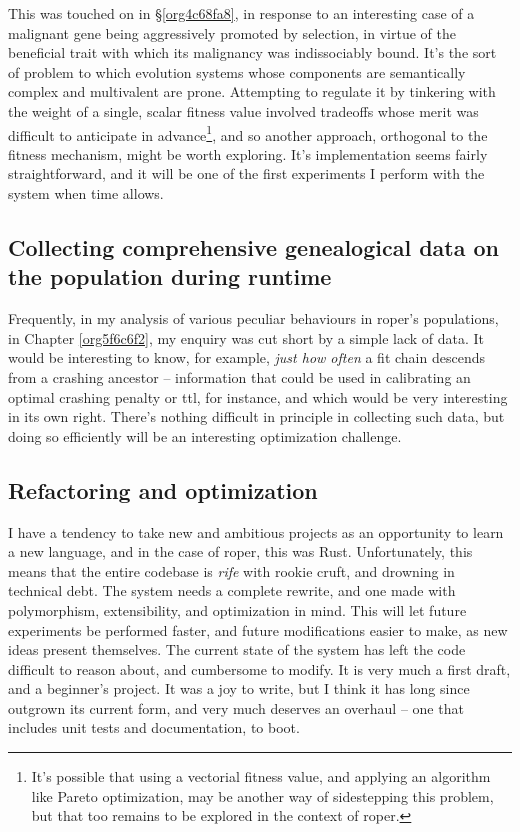 \documentclass[12pt,glossary]{dalthesis}
\begin{document}
This was touched on in \S \ref{org4c68fa8}, in response to an interesting case
of a malignant gene being aggressively promoted by selection, in virtue of the
beneficial trait with which its malignancy was indissociably bound. It's the
sort of problem to which evolution systems whose components are semantically
complex and multivalent are prone. Attempting to regulate it by tinkering with
the weight of a single, scalar fitness value involved tradeoffs whose merit was
difficult to anticipate in advance\footnote{It's possible that using a vectorial fitness value, and applying an algorithm
  like Pareto optimization, may be another way of sidestepping this problem, but
  that too remains to be explored in the context of \gls{roper}.}, and so another approach, orthogonal to the fitness mechanism, might be worth
exploring. It's implementation seems fairly straightforward, and it will be one
of the first experiments I perform with the system when time allows. 

\subsection{Collecting comprehensive genealogical data on the population during runtime}
\label{sec:org22b3f6f}

Frequently, in my analysis of various peculiar behaviours in \gls{roper}'s
populations, in Chapter \ref{org5f6c6f2}, my enquiry was cut short by a simple
lack of data. It would be interesting to know, for example, \emph{just how often} a
fit chain descends from a crashing ancestor -- information that could be used in
calibrating an optimal crashing penalty or \gls{ttl}, for instance, and which would
be very interesting in its own right. There's nothing difficult in principle in
collecting such data, but doing so efficiently will be an interesting optimization
challenge. 

\subsection{Refactoring and optimization}
\label{sec:org9085419}

I have a tendency to take new and ambitious projects as an opportunity to learn
a new language, and in the case of \gls{roper}, this was Rust. Unfortunately, this
means that the entire codebase is \emph{rife} with rookie cruft, and drowning in 
technical debt. The system needs a complete rewrite, and one made with polymorphism,
extensibility, and optimization in mind. This will let future experiments be 
performed faster, and future modifications easier to make, as new ideas present
themselves. The current state of the system has left the code difficult to reason
about, and cumbersome to modify. It is very much a first draft, and a beginner's
project. It was a joy to write, but I think it has long since outgrown its current
form, and very much deserves an overhaul -- one that includes unit tests and
documentation, to boot. 
\end{document}
